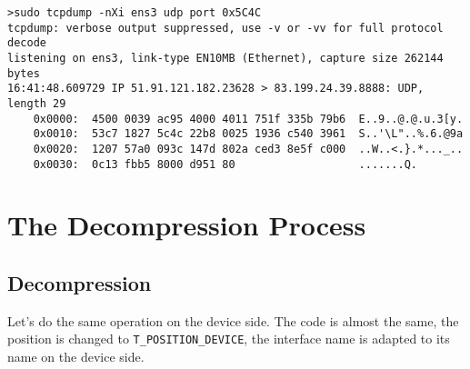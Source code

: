 \begin{lstlisting}[basicstyle=\ttfamily\scriptsize]
>sudo tcpdump -nXi ens3 udp port 0x5C4C
tcpdump: verbose output suppressed, use -v or -vv for full protocol decode
listening on ens3, link-type EN10MB (Ethernet), capture size 262144 bytes
16:41:48.609729 IP 51.91.121.182.23628 > 83.199.24.39.8888: UDP, length 29
	0x0000:  4500 0039 ac95 4000 4011 751f 335b 79b6  E..9..@.@.u.3[y.
	0x0010:  53c7 1827 5c4c 22b8 0025 1936 c540 3961  S..'\L"..%.6.@9a
	0x0020:  1207 57a0 093c 147d 802a ced3 8e5f c000  ..W..<.}.*..._..
	0x0030:  0c13 fbb5 8000 d951 80                   .......Q.

\end{lstlisting}

\section{The Decompression Process}

\subsection{Decompression}

Let's do the same operation on the device side. The code is almost the same, the position is changed to \texttt{T\_POSITION\_DEVICE}, the interface name is adapted to its name on the device side.

